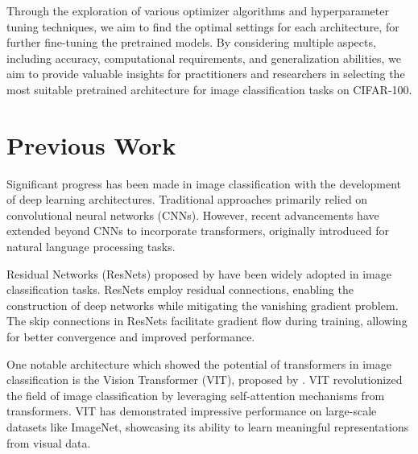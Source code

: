 \documentclass{article}
\begin{document}
Through the exploration of various optimizer algorithms and hyperparameter tuning techniques, we aim to find the optimal settings for each architecture,
for further fine-tuning the pretrained models.
By considering multiple aspects, including accuracy, computational requirements, and generalization abilities, we aim to provide valuable insights for practitioners and researchers in selecting the most suitable pretrained architecture for image classification tasks on CIFAR-100.

\section{Previous Work}
Significant progress has been made in image classification with the development of deep learning architectures. Traditional approaches primarily relied on convolutional neural networks (CNNs). However, recent advancements have extended beyond CNNs to incorporate transformers, originally introduced for natural language processing tasks.

Residual Networks (ResNets) proposed by \cite{he2016deep} have been widely adopted in image classification tasks. ResNets employ residual connections, enabling the construction of deep networks while mitigating the vanishing gradient problem. The skip connections in ResNets facilitate gradient flow during training, allowing for better convergence and improved performance.

One notable architecture which showed the potential of transformers in image classification is the Vision Transformer (VIT), proposed by \cite{DBLP:journals/corr/abs-2010-11929}.
VIT revolutionized the field of image classification by leveraging self-attention mechanisms from transformers.
VIT has demonstrated impressive performance on large-scale datasets like ImageNet, showcasing its ability to learn meaningful representations from visual data.
\end{document}
